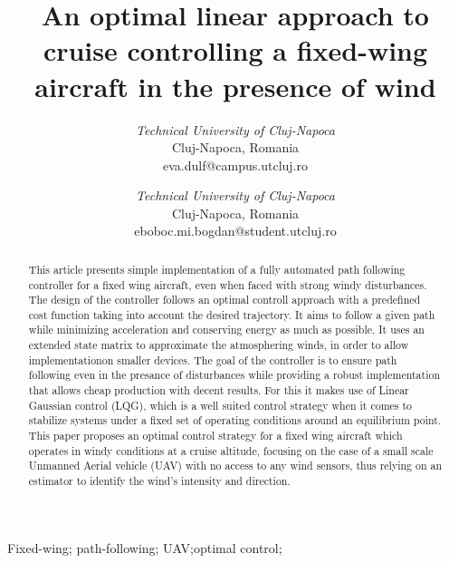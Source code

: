 \documentclass[conference]{IEEEtran}
\begin{document}
\title{An optimal linear approach to cruise controlling a fixed-wing aircraft in the presence of wind}

\author{
\textit{Technical University of Cluj-Napoca}\\
Cluj-Napoca, Romania \\
eva.dulf@campus.utcluj.ro
\and
{}
\textit{Technical University of Cluj-Napoca}\\
Cluj-Napoca, Romania \\
eboboc.mi.bogdan@student.utcluj.ro}
\maketitle

\begin{abstract}
    This article presents simple implementation of a fully automated path following controller for a fixed wing aircraft, even when faced with strong windy disturbances. The design of the controller follows an optimal controll approach with a predefined cost function taking into account the desired trajectory. It aims to follow a given path while minimizing acceleration and conserving energy as much as possible. It uses an extended state matrix to approximate the atmosphering winds, in order to allow implementationon smaller devices. The goal of the controller is to ensure path following even in the presance of disturbances while providing a robust implementation that allows cheap production with decent results. For this it makes use of Linear Gaussian control (LQG), which is a well suited control strategy when it comes to stabilize systems under a fixed set of operating conditions around an equilibrium point. This paper proposes an optimal control strategy for a fixed wing aircraft which operates in windy conditions at a cruise altitude, focusing on the case of a small scale Unmanned Aerial vehicle (UAV) with no access to any wind sensors, thus relying on an estimator to identify the wind's intensity and direction.
\end{abstract}

\begin{IEEEkeywords}
    Fixed-wing; path-following; UAV;optimal control;
\end{IEEEkeywords}

\end{document}
